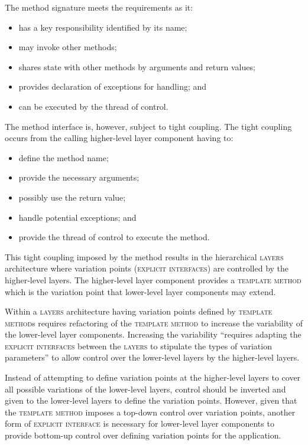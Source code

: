 \documentclass[prodmode]{style/acmlarge}
\begin{document}
The method signature meets the requirements as it:
\begin{itemize}
  \item has a key responsibility identified by its name;
  \item may invoke other methods;
  \item shares state with other methods by arguments and return values;
  \item provides declaration of exceptions for handling; and
  \item can be executed by the thread of control.
\end{itemize}

The method interface is, however, subject to tight coupling.  The tight
coupling occurs from the calling higher-level layer component having to:
\begin{itemize}
  \item define the method name;
  \item provide the necessary arguments;
  \item possibly use the return value;
  \item handle potential exceptions; and
  \item provide the thread of control to execute the method.
\end{itemize}

This tight coupling imposed by the method results in the hierarchical
\textsc{layers} architecture where variation points (\textsc{explicit
interfaces}) are controlled by the higher-level layers.  The higher-level layer
component provides a \textsc{template method} \cite{gof} which is the variation
point that lower-level layer components may extend.

Within a \textsc{layers} architecture having variation points defined by
\textsc{template method}s requires refactoring of the \textsc{template method}
to increase the variability of the lower-level layer components.  Increasing the
variability ``requires adapting the \textsc{explicit interfaces} between the
\textsc{layers} to stipulate the types of variation parameters'' \cite[p.
5]{ioc} to allow control over the lower-level layers by the higher-level layers.

Instead of attempting to define variation points at the higher-level layers to
cover all possible variations of the lower-level layers, control should be
inverted and given to the lower-level layers to define the variation points.
However, given that the \textsc{template method} imposes a top-down control over
variation points, another form of \textsc{explicit interface} is necessary for
lower-level layer components to provide bottom-up control over defining
variation points for the application.
\end{document}
